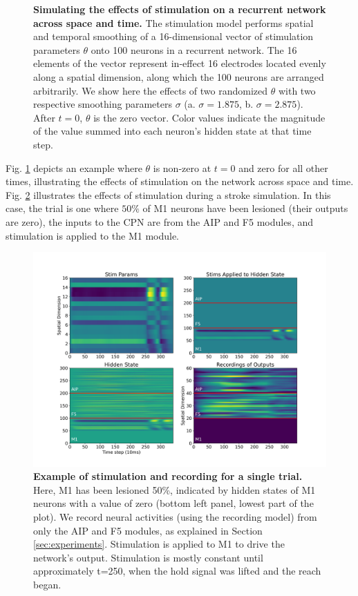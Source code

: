 \documentclass[12pt]{iopart}
\begin{document}
\begin{figure}[h]
	\caption{\textbf{Simulating the effects of stimulation on a recurrent network across space and time.}
          The stimulation model performs spatial and temporal smoothing of a 16-dimensional
	         vector of stimulation parameters $\theta$ onto 100 neurons in a recurrent network.
	         The 16 elements of the vector represent in-effect 16 electrodes located
	         evenly along a spatial dimension, along which the 100 neurons are arranged
	         arbitrarily. We show here the effects of two randomized $\theta$ with two respective smoothing
	         parameters $\sigma$ (a. $\sigma=1.875$, b. $\sigma=2.875$). After $t=0$, $\theta$ is the zero
		   vector. Color values indicate the magnitude of the value summed into each neuron's hidden
		   state at that time step.}
	\label{fig:stim_single}
\end{figure}

\noindent Fig. \ref{fig:stim_single} depicts an example where
$\theta$ is non-zero at $t=0$ and zero for all other times, illustrating the effects of 
stimulation on the network across space and time.  Fig. \ref{fig:stim_and_obs} illustrates the
effects of stimulation during a stroke simulation. In this case, the trial is one where $50\%$
of M1 neurons have been  lesioned (their outputs are zero), the inputs to the CPN are from the
AIP and F5 modules, and stimulation is applied to the M1 module. 

\begin{figure}[h]
	\centering
	\includegraphics[width=\textwidth]{stim_and_obs.png}
	\caption{\textbf{Example of stimulation and recording for a single trial.} Here, M1
	has been lesioned 50\%, indicated by hidden states of M1 neurons with a value of zero (bottom
	left panel, lowest part of the plot). We record neural activities (using the recording model) from only
	 the AIP and F5 modules, as explained in Section \ref{sec:experiments}. Stimulation is applied
	to M1 to drive the network's output. Stimulation is mostly constant until approximately t=250,
	when the hold signal was lifted and the reach began.}
	\label{fig:stim_and_obs}
\end{figure}
\end{document}
